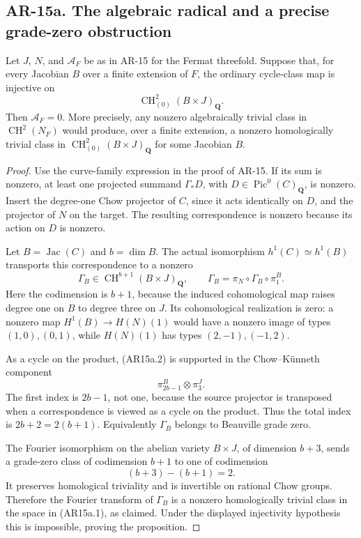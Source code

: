 \subsection*{AR-15a. The algebraic radical and a precise grade-zero obstruction}

\begin{proposition}[AR-15a]
Let \(J\), \(N\), and \(\mathcal A_F\) be as in AR-15 for the Fermat
threefold. Suppose that, for every Jacobian \(B\) over a finite extension
of \(F\), the ordinary cycle-class map is injective on
\[
             \operatorname{CH}^2_{(0)}(B\times J)_{\mathbf Q}.
             \tag{AR15a.1}
\]
Then \(\mathcal A_F=0\). More precisely, any nonzero algebraically
trivial class in \(\operatorname{CH}^2(N_F)\) would produce, over a
finite extension, a nonzero homologically trivial class in
\(\operatorname{CH}^2_{(0)}(B\times J)_{\mathbf Q}\) for some Jacobian
\(B\).
\end{proposition}

\begin{proof}
Use the curve-family expression in the proof of AR-15. If its sum is
nonzero, at least one projected summand
\(\Gamma_*D\), with \(D\in\operatorname{Pic}^0(C)_{\mathbf Q}\),
is nonzero. Insert the degree-one Chow projector of \(C\), since it
acts identically on \(D\), and the projector of \(N\) on the target.
The resulting correspondence is nonzero because its action on \(D\)
is nonzero.

Let \(B=\operatorname{Jac}(C)\) and \(b=\dim B\). The actual isomorphism
\(h^1(C)\simeq h^1(B)\) transports this correspondence to a nonzero
\[
 \Gamma_B\in\operatorname{CH}^{b+1}(B\times J)_{\mathbf Q},
 \qquad
 \Gamma_B=\pi_N\circ\Gamma_B\circ\pi_1^B.
 \tag{AR15a.2}
\]
Here the codimension is \(b+1\), because the induced cohomological
map raises degree one on \(B\) to degree three on \(J\).
Its cohomological realization is zero: a nonzero map
\(H^1(B)\to H(N)(1)\) would have a nonzero image of types
\((1,0),(0,1)\), while \(H(N)(1)\) has types
\((2,-1),(-1,2)\).

As a cycle on the product, (AR15a.2) is supported in the Chow--K\"unneth
component
\[
        \pi_{2b-1}^B\otimes\pi_3^J.
\]
The first index is \(2b-1\), not one, because the source projector
is transposed when a correspondence is viewed as a cycle on the
product. Thus the total index is \(2b+2=2(b+1)\).
Equivalently \(\Gamma_B\) belongs to Beauville grade zero.

The Fourier isomorphism on the abelian variety \(B\times J\), of
dimension \(b+3\), sends a grade-zero class of codimension \(b+1\)
to one of codimension
\[
             (b+3)-(b+1)=2.
\]
It preserves homological triviality and is invertible on rational
Chow groups. Therefore the Fourier transform of \(\Gamma_B\) is a
nonzero homologically trivial class in the space in (AR15a.1), as
claimed. Under the displayed injectivity hypothesis this is
impossible, proving the proposition.
\end{proof}

